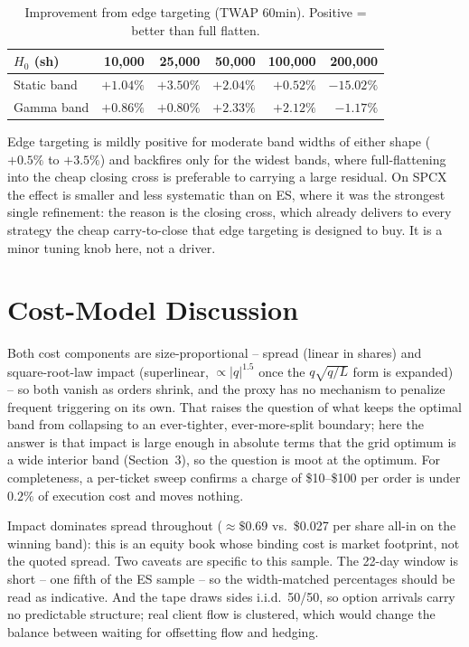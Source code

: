 \documentclass[11pt]{article}
\begin{document}
\begin{table}[htbp]
\centering
\small
\begin{tabular}{lrrrrr}
\toprule
$H_0$ (sh) & 10{,}000 & 25{,}000 & 50{,}000 & 100{,}000 & 200{,}000 \\
\midrule
Static band & $+1.04\%$ & $+3.50\%$ & $+2.04\%$ & $+0.52\%$ & $-15.02\%$ \\
Gamma band  & $+0.86\%$ & $+0.80\%$ & $+2.33\%$ & $+2.12\%$ & $-1.17\%$ \\
\bottomrule
\end{tabular}
\caption{Improvement from edge targeting (TWAP 60min). Positive = better than full
flatten.}
\end{table}

Edge targeting is mildly positive for moderate band widths of either shape ($+0.5\%$ to
$+3.5\%$) and backfires only for the widest bands, where full-flattening into the cheap
closing cross is preferable to carrying a large residual. On SPCX the effect is smaller and
less systematic than on ES, where it was the strongest single refinement: the reason is the
closing cross, which already delivers to every strategy the cheap carry-to-close that
edge targeting is designed to buy. It is a minor tuning knob here, not a driver.

\section{Cost-Model Discussion}

Both cost components are size-proportional -- spread (linear in shares) and square-root-law
impact (superlinear, $\propto \lvert q \rvert^{1.5}$ once the $q\sqrt{q/L}$ form is
expanded) -- so both vanish as orders shrink, and the proxy has no mechanism to penalize
frequent triggering on its own. That raises the question of what keeps the optimal band from
collapsing to an ever-tighter, ever-more-split boundary; here the answer is that impact is
large enough in absolute terms that the grid optimum is a wide interior band (Section~3), so
the question is moot at the optimum. For completeness, a per-ticket sweep confirms a charge of
\$10--\$100 per order is under $0.2\%$ of execution cost and moves nothing.

Impact dominates spread throughout ($\approx\$0.69$ vs.\ \$0.027 per share all-in on the
winning band): this is an equity book whose binding cost is market footprint, not the quoted
spread. Two caveats are specific to this sample. The 22-day window is short -- one fifth of
the ES sample -- so the width-matched percentages should be read as indicative. And the tape
draws sides i.i.d.\ 50/50, so option arrivals carry no predictable structure; real client
flow is clustered, which would change the balance between waiting for offsetting flow and
hedging.
\end{document}

